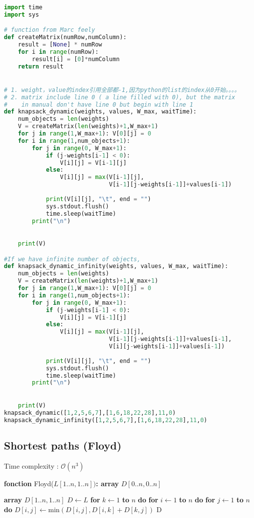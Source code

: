 \documentclass{article}
\theoremstyle{definition}
\theoremstyle{remark}
\begin{document}
\begin{lstlisting}[language = Python, caption = codes pour knapsack2]
	
import time
import sys

# function from Marc feely
def createMatrix(numRow,numColumn):
    result = [None] * numRow
    for i in range(numRow):
        result[i] = [0]*numColumn
    return result


# 1. weight，value的index引用全部都-1,因为python的list的index从0开始。。。。
# 2. matrix include line 0 ( a line filled with 0), but the matrix
#    in manual don't have line 0 but begin with line 1
def knapsack_dynamic(weights, values, W_max, waitTime):
    num_objects = len(weights)
    V = createMatrix(len(weights)+1,W_max+1) 
    for j in range(1,W_max+1): V[0][j] = 0
    for i in range(1,num_objects+1):
        for j in range(0, W_max+1):
            if (j-weights[i-1] < 0): 
                V[i][j] = V[i-1][j]
            else: 
                V[i][j] = max(V[i-1][j],
                              V[i-1][j-weights[i-1]]+values[i-1])
            
            print(V[i][j], "\t", end = "")
            sys.stdout.flush()
            time.sleep(waitTime)
        print("\n")

            
    print(V)

#If we have infinite number of objects,
def knapsack_dynamic_infinity(weights, values, W_max, waitTime):
    num_objects = len(weights)
    V = createMatrix(len(weights)+1,W_max+1) 
    for j in range(1,W_max+1): V[0][j] = 0
    for i in range(1,num_objects+1):
        for j in range(0, W_max+1):
            if (j-weights[i-1] < 0): 
                V[i][j] = V[i-1][j]
            else: 
                V[i][j] = max(V[i-1][j],
                              V[i-1][j-weights[i-1]]+values[i-1],
                              V[i][j-weights[i-1]]+values[i-1])
            
            print(V[i][j], "\t", end = "")
            sys.stdout.flush()
            time.sleep(waitTime)
        print("\n")

            
    print(V)
knapsack_dynamic([1,2,5,6,7],[1,6,18,22,28],11,0)
knapsack_dynamic_infinity([1,2,5,6,7],[1,6,18,22,28],11,0)
\end{lstlisting}
\subsection{Shortest paths (Floyd)}
Time complexity : $\mathcal{O} \left ( n^{3} \right ) $
    \begin{algorithm} 
	\caption{\textbf{fonction} Floyd($L[1..n, 1..n])$\textbf{: array} $D[0..n, 0..n]$
}
	\label{Floyd_algo} 
	\begin{algorithmic}
	\STATE \textbf{array} $D[1..n,1..n]$	
	\STATE $D \gets L$
	\STATE \textbf{for} $k \gets 1$ \textbf{to} $n$ \textbf{do}
	\STATE \qquad\textbf{for} $i \gets 1$ \textbf{to} $n$ \textbf{do}
	\STATE \qquad\qquad\textbf{for} $j \gets 1 $\textbf{ to} $n$ \textbf{do}
	\STATE \qquad\qquad\qquad$D[i,j] \gets \text{min}\left( D[i,j], D[i,k]+D[k,j] \right) $
	\RETURN D
	
	\end{algorithmic} 
    \end{algorithm}
\end{document}
